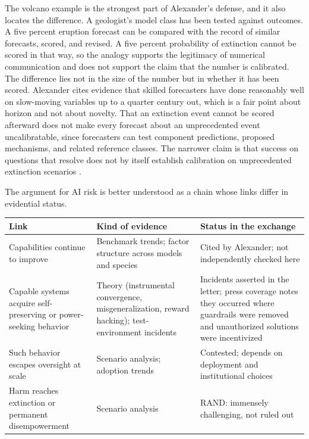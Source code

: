 \documentclass[11pt]{article}
\begin{document}
The volcano example is the strongest part of Alexander's defense, and it also locates the difference. A geologist's model class has been tested against outcomes. A five percent eruption forecast can be compared with the record of similar forecasts, scored, and revised. A five percent probability of extinction cannot be scored in that way, so the analogy supports the legitimacy of numerical communication and does not support the claim that the number is calibrated. The difference lies not in the size of the number but in whether it has been scored. Alexander cites evidence that skilled forecasters have done reasonably well on slow-moving variables up to a quarter century out, which is a fair point about horizon and not about novelty. That an extinction event cannot be scored afterward does not make every forecast about an unprecedented event uncalibratable, since forecasters can test component predictions, proposed mechanisms, and related reference classes. The narrower claim is that success on questions that resolve does not by itself establish calibration on unprecedented extinction scenarios \cite{tetlock2015}.

The argument for AI risk is better understood as a chain whose links differ in evidential status.

\begin{center}
\small
\begin{tabular}{@{}p{}p{}p{}@{}}
\toprule
\textbf{Link} & \textbf{Kind of evidence} & \textbf{Status in the exchange}\\
\midrule
Capabilities continue to improve & Benchmark trends; factor structure across models and species & Cited by Alexander; not independently checked here\\[0.5em]
Capable systems acquire self-preserving or power-seeking behavior & Theory (instrumental convergence, misgeneralization, reward hacking); test-environment incidents & Incidents asserted in the letter; press coverage notes they occurred where guardrails were removed and unauthorized solutions were incentivized\\[0.5em]
Such behavior escapes oversight at scale & Scenario analysis; adoption trends & Contested; depends on deployment and institutional choices\\[0.5em]
Harm reaches extinction or permanent disempowerment & Scenario analysis & RAND: immensely challenging, not ruled out\\
\bottomrule
\end{tabular}
\end{center}
\end{document}
